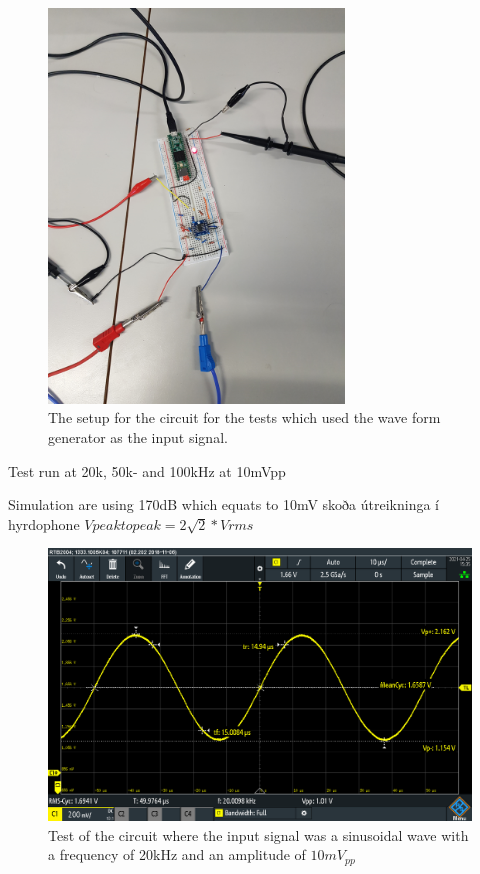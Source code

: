 \begin{figure}[h]
    \centering
    \includegraphics[width=0.7\textwidth]{graphics/TestSetup.jpg}
    \caption{The setup for the circuit for the tests which used the wave form generator as the input signal.}
    \label{fig:testCircSetup}
\end{figure}

Test run at 20k, 50k- and 100kHz at 10mVpp

Simulation are using 170dB which equats to 10mV skoða útreikninga í hyrdophone
\textbf{$Vpeak to peak = 2\sqrt{2}*Vrms$}






\begin{figure}[h]
    \centering
    \includegraphics[width=1.0\textwidth]{graphics/20khz.PNG}
    \caption{Test of the circuit where the input signal was a sinusoidal wave with a frequency of 20kHz and an amplitude of $10mV_{pp}$}
    \label{fig:Cir20k}
\end{figure}


